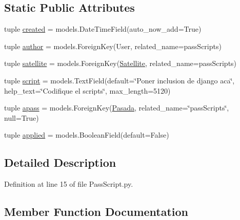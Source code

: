 \subsection*{Static Public Attributes}
\begin{DoxyCompactItemize}
\item 
tuple \hyperlink{class_ground_segment_1_1models_1_1_command_1_1_pass_script_1_1_pass_script_ad19259b692f73bfba44c971de2996edd}{created} = models.\+Date\+Time\+Field(auto\+\_\+now\+\_\+add=True)
\item 
tuple \hyperlink{class_ground_segment_1_1models_1_1_command_1_1_pass_script_1_1_pass_script_a7166dcd816bbd9ed536d455007c50357}{author} = models.\+Foreign\+Key(User, related\+\_\+name=\textquotesingle{}pass\+Scripts\textquotesingle{})
\item 
tuple \hyperlink{class_ground_segment_1_1models_1_1_command_1_1_pass_script_1_1_pass_script_a75020614d363fc6903dc9912b3fd06fe}{satellite} = models.\+Foreign\+Key(\hyperlink{class_ground_segment_1_1models_1_1_satellite_1_1_satellite}{Satellite}, related\+\_\+name=\textquotesingle{}pass\+Scripts\textquotesingle{})
\item 
tuple \hyperlink{class_ground_segment_1_1models_1_1_command_1_1_pass_script_1_1_pass_script_a48a085049e0623794c1742fde3752e42}{script} = models.\+Text\+Field(default=\char`\"{}Poner inclusion de django aca\char`\"{}, help\+\_\+text=\char`\"{}Codifique el scripts\char`\"{}, max\+\_\+length=5120)
\item 
tuple \hyperlink{class_ground_segment_1_1models_1_1_command_1_1_pass_script_1_1_pass_script_ac749a185584cb43885a148abaf414e4a}{apass} = models.\+Foreign\+Key(\hyperlink{class_ground_segment_1_1models_1_1_pasada_1_1_pasada}{Pasada}, related\+\_\+name=\char`\"{}pass\+Scripts\char`\"{}, null=True)
\item 
tuple \hyperlink{class_ground_segment_1_1models_1_1_command_1_1_pass_script_1_1_pass_script_a9e6d8cd987531f5cd7cabfb170a3970b}{applied} = models.\+Boolean\+Field(default=False)
\end{DoxyCompactItemize}


\subsection{Detailed Description}


Definition at line 15 of file Pass\+Script.\+py.



\subsection{Member Function Documentation}
\hypertarget{class_ground_segment_1_1models_1_1_command_1_1_pass_script_1_1_pass_script_a4dcb308f74810861597d708fa7446255}{}
